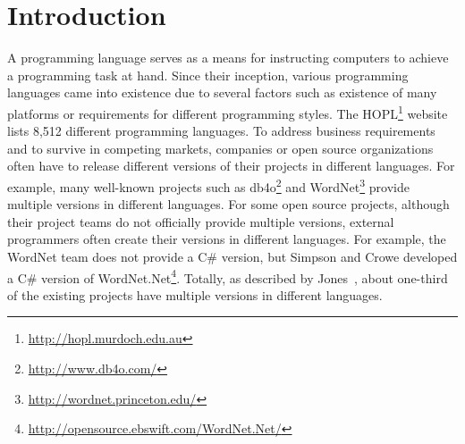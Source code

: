 \section{Introduction}
\label{sec:introduction}

A programming language serves as a means for instructing computers
to achieve a programming task at hand. Since their inception,
various programming languages came into existence due to several
factors such as existence of many platforms or requirements for
different programming styles. The
HOPL\footnote{\url{http://hopl.murdoch.edu.au}} website lists 8,512
different programming languages. To address business requirements
and to survive in competing markets, companies or open source
organizations often have to release different versions of their
projects in different languages. For example, many well-known
projects such as
db4o\footnote{\url{http://www.db4o.com/}} and
WordNet\footnote{\url{http://wordnet.princeton.edu/}} provide
multiple versions in different languages. For some open source
projects, although their project teams do not officially provide
multiple versions, external programmers often create their versions
in different languages. For example, the WordNet team does not
provide a C\# version, but Simpson and Crowe developed a C\# version
of
WordNet.Net\footnote{\url{http://opensource.ebswift.com/WordNet.Net/}}.
Totally, as described by Jones~\cite{jones1998estimating}, about
one-third of the existing projects have multiple versions in
different languages.


